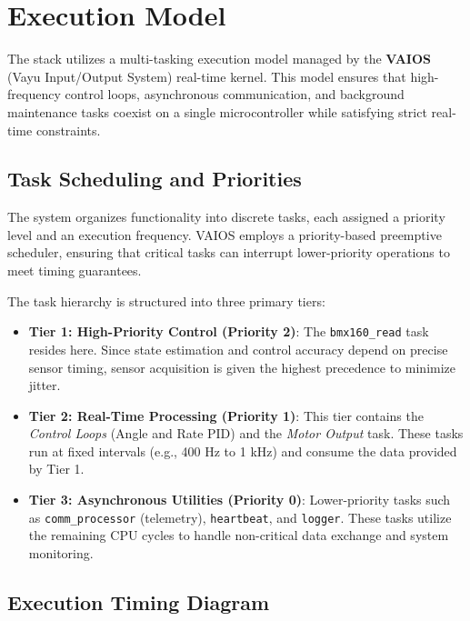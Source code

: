 \section{Execution Model}
\label{sec:execution}

The stack utilizes a multi-tasking execution model managed by the \textbf{VAIOS} (Vayu Input/Output System) real-time kernel. This model ensures that high-frequency control loops, asynchronous communication, and background maintenance tasks coexist on a single microcontroller while satisfying strict real-time constraints.

\subsection{Task Scheduling and Priorities}

The system organizes functionality into discrete tasks, each assigned a priority level and an execution frequency. VAIOS employs a priority-based preemptive scheduler, ensuring that critical tasks can interrupt lower-priority operations to meet timing guarantees.

The task hierarchy is structured into three primary tiers:

\begin{itemize}
    \item \textbf{Tier 1: High-Priority Control (Priority 2)}:  
    The \texttt{bmx160\_read} task resides here. Since state estimation and control accuracy depend on precise sensor timing, sensor acquisition is given the highest precedence to minimize jitter.
    
    \item \textbf{Tier 2: Real-Time Processing (Priority 1)}:  
    This tier contains the \textit{Control Loops} (Angle and Rate PID) and the \textit{Motor Output} task. These tasks run at fixed intervals (e.g., 400 Hz to 1 kHz) and consume the data provided by Tier 1.
    
    \item \textbf{Tier 3: Asynchronous Utilities (Priority 0)}:  
    Lower-priority tasks such as \texttt{comm\_processor} (telemetry), \texttt{heartbeat}, and \texttt{logger}. These tasks utilize the remaining CPU cycles to handle non-critical data exchange and system monitoring.
\end{itemize}

\subsection{Execution Timing Diagram}

